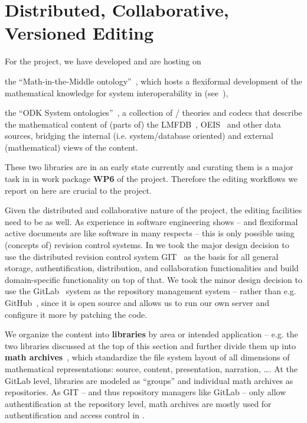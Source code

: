 \section{Distributed, Collaborative, Versioned Editing}\label{sec:editing}

For the \pn project, we have developed and are hosting on \sys
\begin{compactenum}
\item the ``Math-in-the-Middle ontology''~\cite{MitM:on}, which hosts a flexiformal
  development of the mathematical knowledge for system interoperability in \pn
  (see~\cite{DehKohKon:iop16,ODK-D6.2}),
\item the ``ODK System ontologies''~\cite{ODKsysonto:on}, a collection of \omdoc/\mmt
  theories and codecs that describe the mathematical content of (parts of) the
  LMFDB~\cite{lmfdb:on}, OEIS~\cite{oeis} and other data sources, bridging the internal
  (i.e. system/database oriented) and external (mathematical) views of the content.
\end{compactenum}
These two \sys libraries are in an early state currently and curating them is a major task
in in work package \textbf{WP6} of the \pn project. Therefore the editing workflows we
report on here are crucial to the \pn project.

Given the distributed and collaborative nature of the \pn project, the editing facilities
need to be as well. As experience in software engineering shows -- and flexiformal active
documents are like software in many respects -- this is only possible using (concepts of)
revision control systems. In \sys we took the major design decision to use the distributed
revision control system GIT~\cite{GIT:on} as the basis for all general storage,
authentification, distribution, and collaboration functionalities and build
domain-specific functionality on top of that. We took the minor design decision to use the
GitLab~\cite{GitLab:on} system as the repository management system -- rather than e.g.
GitHub~\cite{GitHub:on}, since it is open source and allows us to run our own server and
configure it more by patching the code.

We organize the content into \textbf{libraries} by area or intended application --
e.g. the two libraries discussed at the top of this section and further divide them up
into \textbf{math archives}~\cite{HorIacJuc:cscpnrr11}, which standardize the file system
layout of all dimensions of mathematical representations: source, content, presentation,
narration, \ldots. At the GitLab level, libraries are modeled as ``groups'' and individual
math archives as repositories. As GIT -- and thus repository managers like GitLab -- only
allow authentification at the repository level, math archives are mostly used for
authentification and access control in \sys.

